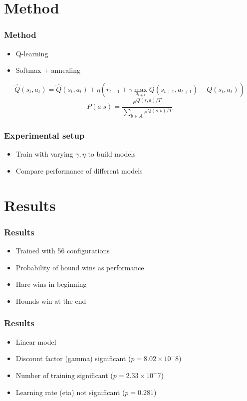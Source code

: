 \documentclass{beamer}
\begin{document}
\section{Method}
\begin{frame}
	\frametitle{Method}
	\begin{itemize}
		\item Q-learning
		\item Softmax + annealing
	\end{itemize}
	\[ \hat{Q}(s_t, a_t) = \hat{Q}(s_t, a_t) + \eta \left(r_{t+1} + \gamma \max_{a_{t+1}} Q(s_{t+1}, a_{t+1}) - Q(s_t, a_t)\right) \]
	\[ P(a|s) = \frac{e^{Q(s,a) / T}} {\sum_{b\in A} e^{Q(s,b)/T}} \]
\end{frame}

\begin{frame}
	\frametitle{Experimental setup}
	\begin{itemize}
		\item Train with varying $\gamma, \eta$ to build models
		\item Compare performance of different models
	\end{itemize}
\end{frame}

\section{Results}
\begin{frame}
    \frametitle{Results}
    \begin{itemize}
        \item Trained with 56 configurations
        \item Probability of hound wins as performance

            \phantom{M}

        \item Hare wins in beginning
        \item Hounds win at the end
    \end{itemize}
\end{frame}

\begin{frame}
    \frametitle{Results}
    \begin{itemize}
        \item Linear model
        \item Discount factor (gamma) significant ($p = 8.02 \times 10^-8$)
        \item Number of training significant ($p = 2.33 \times 10^-7$)
        \item Learning rate (eta) not significant ($p = 0.281$)
    \end{itemize}
\end{frame}
\end{document}
